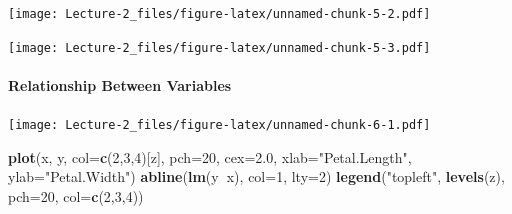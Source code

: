 \documentclass[
]{article}
\newenvironment{Shaded}{\begin{snugshade}}{\end{snugshade}}
\newcommand{\DataTypeTok}[1]{\textcolor[rgb]{0.13,0.29,0.53}{#1}}
\newcommand{\DecValTok}[1]{\textcolor[rgb]{0.00,0.00,0.81}{#1}}
\newcommand{\FloatTok}[1]{\textcolor[rgb]{0.00,0.00,0.81}{#1}}
\newcommand{\KeywordTok}[1]{\textcolor[rgb]{0.13,0.29,0.53}{\textbf{#1}}}
\newcommand{\NormalTok}[1]{#1}
\newcommand{\OperatorTok}[1]{\textcolor[rgb]{0.81,0.36,0.00}{\textbf{#1}}}
\newcommand{\StringTok}[1]{\textcolor[rgb]{0.31,0.60,0.02}{#1}}
\begin{document}
\texttt{[image: Lecture-2\_files/figure-latex/unnamed-chunk-5-2.pdf]}

\begin{Shaded}
\end{Shaded}

\texttt{[image: Lecture-2\_files/figure-latex/unnamed-chunk-5-3.pdf]}

\hypertarget{relationship-between-variables}{%
\paragraph{Relationship Between
Variables}\label{relationship-between-variables}}

\begin{Shaded}
\end{Shaded}

\texttt{[image: Lecture-2\_files/figure-latex/unnamed-chunk-6-1.pdf]}

\begin{Shaded}
\begin{Highlighting}[]
\KeywordTok{plot}\NormalTok{(x, y, }\DataTypeTok{col=}\KeywordTok{c}\NormalTok{(}\DecValTok{2}\NormalTok{,}\DecValTok{3}\NormalTok{,}\DecValTok{4}\NormalTok{)[z], }\DataTypeTok{pch=}\DecValTok{20}\NormalTok{, }\DataTypeTok{cex=}\FloatTok{2.0}\NormalTok{, }\DataTypeTok{xlab=}\StringTok{"Petal.Length"}\NormalTok{, }\DataTypeTok{ylab=}\StringTok{"Petal.Width"}\NormalTok{) }
\KeywordTok{abline}\NormalTok{(}\KeywordTok{lm}\NormalTok{(y}\OperatorTok{~}\NormalTok{x), }\DataTypeTok{col=}\DecValTok{1}\NormalTok{, }\DataTypeTok{lty=}\DecValTok{2}\NormalTok{) }
\KeywordTok{legend}\NormalTok{(}\StringTok{"topleft"}\NormalTok{, }\KeywordTok{levels}\NormalTok{(z), }\DataTypeTok{pch=}\DecValTok{20}\NormalTok{, }\DataTypeTok{col=}\KeywordTok{c}\NormalTok{(}\DecValTok{2}\NormalTok{,}\DecValTok{3}\NormalTok{,}\DecValTok{4}\NormalTok{))}
\end{Highlighting}
\end{Shaded}
\end{document}
